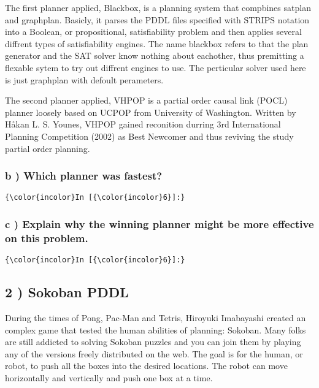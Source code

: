 \documentclass{article}
\begin{document}
    The first planner applied, Blackbox, is a planning system that compbines
satplan and graphplan. Basicly, it parses the PDDL files specified with
STRIPS notation into a Boolean, or propositional, satisfiability problem
and then applies several diffrent types of satisfiability engines. The
name blackbox refers to that the plan generator and the SAT solver know
nothing about eachother, thus premitting a flexable sytem to try out
diffrent engines to use. The perticular solver used here is just
graphplan with defoult perameters.

The second planner applied, VHPOP is a partial order causal link (POCL)
planner loosely based on UCPOP from University of Washington. Written by
Håkan L. S. Younes, VHPOP gained reconition durring 3rd International
Planning Competition (2002) as Best Newcomer and thus reviving the study
partial order planning.


    \subsubsection{b ) Which planner was fastest?}


    \begin{Verbatim}[commandchars=\\\{\}]
{\color{incolor}In [{\color{incolor}6}]:} 
\end{Verbatim}


    \subsubsection{c ) Explain why the winning planner might be more effective on this
problem.}


    \begin{Verbatim}[commandchars=\\\{\}]
{\color{incolor}In [{\color{incolor}6}]:} 
\end{Verbatim}


    \subsection{2 ) Sokoban PDDL}


    During the times of Pong, Pac-Man and Tetris, Hiroyuki Imabayashi
created an complex game that tested the human abilities of planning:
Sokoban. Many folks are still addicted to solving Sokoban puzzles and
you can join them by playing any of the versions freely distributed on
the web. The goal is for the human, or robot, to push all the boxes into
the desired locations. The robot can move horizontally and vertically
and push one box at a time.
\end{document}
